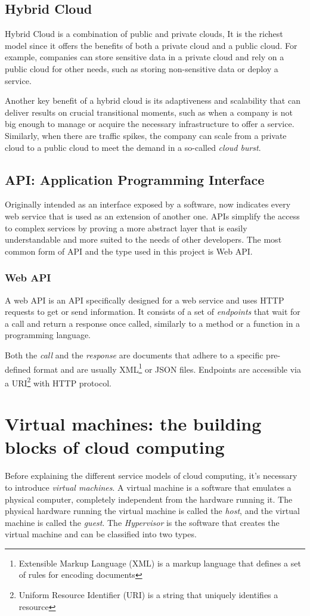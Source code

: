 \subsection{Hybrid Cloud}
Hybrid Cloud is a combination of public and private clouds, It is the
richest model since it offers the benefits of both a private cloud and
a public cloud.  For example, companies can store sensitive data in a
private cloud and rely on a public cloud for other needs, such as
storing non-sensitive data or deploy a service.

Another key benefit of a hybrid cloud is its adaptiveness and
scalability that can deliver results on crucial transitional moments,
such as when a company is not big enough to manage or acquire the
necessary infrastructure to offer a service.  Similarly, when there
are traffic spikes, the company can scale from a private cloud to a
public cloud to meet the demand in a so-called \textit{cloud burst}.


\subsection{API: Application Programming Interface}
\label{sec:API}
Originally intended as an interface exposed by a software, now
indicates every web service that is used as an extension of another
one.  APIs simplify the access to complex services by proving a more
abstract layer that is easily understandable and more suited to the
needs of other developers.  The most common form of API and the type
used in this project is Web API.

\subsubsection{Web API}
A web API is an API specifically designed for a web service and uses
HTTP requests to get or send information.  It consists of a set of
\textit{endpoints} that wait for a call and return a response once
called, similarly to a method or a function in a programming language.

Both the \textit{call} and the \textit{response} are documents that
adhere to a specific pre-defined format and are usually
XML\footnote{Extensible Markup Language (XML) is a markup language
  that defines a set of rules for encoding documents} or JSON files.
Endpoints are accessible via a URI\footnote{Uniform Resource
  Identifier (URI) is a string that uniquely identifies a resource}
with HTTP protocol.

\section{Virtual machines: the building blocks of cloud computing}
\label{sec:virtualmachine}
Before explaining the different service models of cloud computing,
it's necessary to introduce \textit{virtual machines}.  A virtual
machine is a software that emulates a physical computer, completely
independent from the hardware running it.  The physical hardware
running the virtual machine is called the \textit{host}, and the
virtual machine is called the \textit{guest}.  The \textit{Hypervisor}
is the software that creates the virtual machine and can be classified
into two types.

